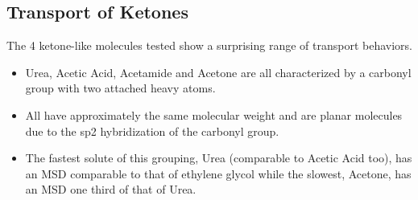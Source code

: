 \documentclass{article}
\begin{document}
  

  \subsection*{Transport of Ketones}
  
  The 4 ketone-like molecules tested show a surprising range of transport behaviors.
  \begin{itemize}
    \item Urea, Acetic Acid, Acetamide and Acetone are all characterized by a carbonyl group
    with two attached heavy atoms. 
    \item All have approximately the same molecular weight and are planar molecules due to
    the sp2 hybridization of the carbonyl group.
    \item The fastest solute of this grouping, Urea (comparable to Acetic Acid too), has an
    MSD comparable to that of ethylene glycol while the slowest, Acetone, has an MSD one 
    third of that of Urea.
  \end{itemize}
  
\end{document}
